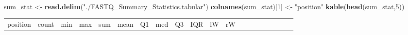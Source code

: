 \documentclass[
]{article}
\newenvironment{Shaded}{\begin{snugshade}}{\end{snugshade}}
\newcommand{\DecValTok}[1]{\textcolor[rgb]{0.00,0.00,0.81}{#1}}
\newcommand{\KeywordTok}[1]{\textcolor[rgb]{0.13,0.29,0.53}{\textbf{#1}}}
\newcommand{\NormalTok}[1]{#1}
\newcommand{\StringTok}[1]{\textcolor[rgb]{0.31,0.60,0.02}{#1}}
\begin{document}
\begin{Shaded}
\begin{Highlighting}[]
\NormalTok{sum_stat <-}\StringTok{ }\KeywordTok{read.delim}\NormalTok{(}\StringTok{"./FASTQ_Summary_Statistics.tabular"}\NormalTok{)}
\KeywordTok{colnames}\NormalTok{(sum_stat)[}\DecValTok{1}\NormalTok{] <-}\StringTok{ "position"}
\KeywordTok{kable}\NormalTok{(}\KeywordTok{head}\NormalTok{(sum_stat,}\DecValTok{5}\NormalTok{))}
\end{Highlighting}
\end{Shaded}

\begin{longtable}[]{@{}rrrrrrrrrrrrlrrrrrll@{}}
\toprule
\begin{minipage}[b]{0.02\columnwidth}\raggedleft
position\strut
\end{minipage} & \begin{minipage}[b]{0.02\columnwidth}\raggedleft
count\strut
\end{minipage} & \begin{minipage}[b]{0.01\columnwidth}\raggedleft
min\strut
\end{minipage} & \begin{minipage}[b]{0.01\columnwidth}\raggedleft
max\strut
\end{minipage} & \begin{minipage}[b]{0.02\columnwidth}\raggedleft
sum\strut
\end{minipage} & \begin{minipage}[b]{0.02\columnwidth}\raggedleft
mean\strut
\end{minipage} & \begin{minipage}[b]{0.01\columnwidth}\raggedleft
Q1\strut
\end{minipage} & \begin{minipage}[b]{0.01\columnwidth}\raggedleft
med\strut
\end{minipage} & \begin{minipage}[b]{0.01\columnwidth}\raggedleft
Q3\strut
\end{minipage} & \begin{minipage}[b]{0.01\columnwidth}\raggedleft
IQR\strut
\end{minipage} & \begin{minipage}[b]{0.01\columnwidth}\raggedleft
lW\strut
\end{minipage} & \begin{minipage}[b]{0.01\columnwidth}\raggedleft
rW\strut
\end{minipage} & \begin{minipage}[b]{0.21\columnwidth}\raggedright

\end{minipage}
\end{longtable}
\end{document}

